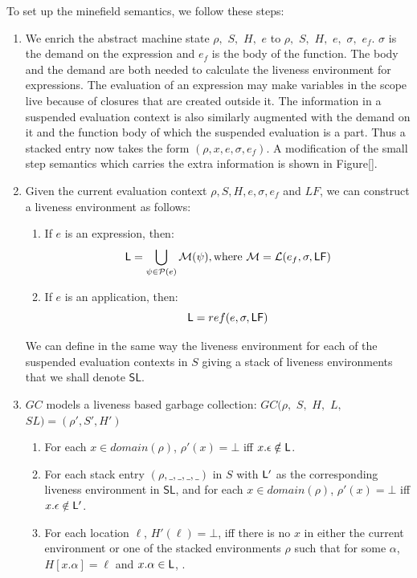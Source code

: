 \documentclass[9pt]{sigplanconf}
\begin{document}
To set up the minefield semantics, we follow these steps:
\begin{enumerate}
\item We enrich  the abstract machine state $\rho,$ $S,$  $ H,$ $e$ to
  $\rho,$ $S,$ $H,$  $e,$ $\sigma,$ $e_f$.  $\sigma$ is  the demand on
  the expression and $e_f$ is the  body of the function.  The body and
  the demand are both needed to calculate the liveness environment for
  expressions.  The evaluation of  an expression may make variables in
  the scope live because of closures that are created outside it.  The
  information  in a  suspended  evaluation context  is also  similarly
  augmented with the demand on it and the function body of which the
  suspended evaluation is a part.  Thus a stacked entry now takes the
  form $(\rho, x, e, \sigma, e_f)$. A modification of the small step
  semantics which carries the extra information is shown in Figure[].
\item Given the current evaluation context $\rho, S, H, e, \sigma,
  e_f$ and $LF$, we can construct a liveness environment as follows:
  \begin{enumerate}
  \item If $e$ is an expression, then:  
  $$ \mathsf{L} = \bigcup_{\psi \in \mathcal{P}(e)} \mathcal{M}(\psi),
    \text{where }
  \mathcal{M} = \mathcal{L}(e_f, \sigma, \mathsf{LF})$$
\item If $e$ is an application, then:  
  $$ \mathsf{L} = ref(e, \sigma, \mathsf{LF})$$
  \end{enumerate}
We can define in the same way the liveness environment for each of the
suspended  evaluation contexts in  $S$  giving  a  stack of  liveness
environments that we shall denote $\mathsf{SL}$.
\item $GC$ models a liveness based garbage collection:
$GC(\rho,$ $ S,$ $ H,$ $ L,$ $ SL) = (\rho', S', H')$ 
  \begin{enumerate}
  \item For each $x \in domain(\rho)$,  $\rho'(x)=\bot$ iff $x.\epsilon
    \notin \mathsf{L}$.
\item For each stack entry $(\rho,\_,\_,\_,\_)$ in $S$ with $\mathsf{L}'$ as
  the corresponding liveness environment in $\mathsf{SL}$,  and for each $x
  \in domain(\rho)$,  $\rho'(x)=\bot$
  iff $x.\epsilon \notin \mathsf{L}'$.
\item For each location $\ell$, $H'(\ell) = \bot$, iff  there is no
  $x$ in either the current environment or one of the stacked
  environments $\rho$ such that for some $\alpha$, $H[x.\alpha] =
  \ell$  and $x.\alpha \in \mathsf{L}$, .
  \end{enumerate}
\end{enumerate}
\end{document}
